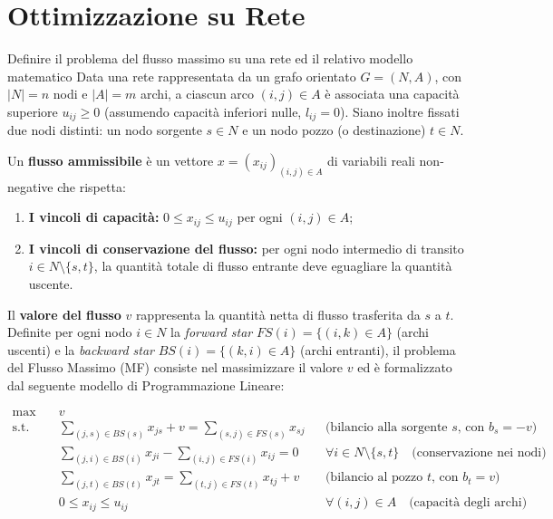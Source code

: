\documentclass[12pt]{extarticle} %
\begin{document}
\newpage

\section{Ottimizzazione su Rete}


\begin{teoriabox}{Definire il problema del flusso massimo su una rete ed il relativo modello matematico}
Data una rete rappresentata da un grafo orientato $G = (N, A)$, con $|N| = n$ nodi e $|A| = m$ archi, a ciascun arco $(i, j) \in A$ è associata una capacità superiore $u_{ij} \ge 0$ (assumendo capacità inferiori nulle, $l_{ij} = 0$). Siano inoltre fissati due nodi distinti: un nodo sorgente $s \in N$ e un nodo pozzo (o destinazione) $t \in N$.

Un \textbf{flusso ammissibile} è un vettore $x = (x_{ij})_{(i,j) \in A}$ di variabili reali non-negative che rispetta:
\begin{enumerate}
    \item \textbf{I vincoli di capacità:} $0 \le x_{ij} \le u_{ij}$ per ogni $(i, j) \in A$;
    \item \textbf{I vincoli di conservazione del flusso:} per ogni nodo intermedio di transito $i \in N \setminus \{s, t\}$, la quantità totale di flusso entrante deve eguagliare la quantità uscente.
\end{enumerate}

Il \textbf{valore del flusso} $v$ rappresenta la quantità netta di flusso trasferita da $s$ a $t$.
Definite per ogni nodo $i \in N$ la \emph{forward star} $FS(i) = \{(i, k) \in A\}$ (archi uscenti) e la \emph{backward star} $BS(i) = \{(k, i) \in A\}$ (archi entranti), il problema del Flusso Massimo (MF) consiste nel massimizzare il valore $v$ ed è formalizzato dal seguente modello di Programmazione Lineare:

\begin{align*}
    \max \quad & v \\
    \text{s.t.} \quad 
    & \sum_{(j, s) \in BS(s)} x_{js} + v = \sum_{(s, j) \in FS(s)} x_{sj} && \text{(bilancio alla sorgente $s$, con $b_s = -v$)} \\
    & \sum_{(j, i) \in BS(i)} x_{ji} - \sum_{(i, j) \in FS(i)} x_{ij} = 0 && \forall i \in N \setminus \{s, t\} \quad \text{(conservazione nei nodi)} \\
    & \sum_{(j, t) \in BS(t)} x_{jt} = \sum_{(t, j) \in FS(t)} x_{tj} + v && \text{(bilancio al pozzo $t$, con $b_t = v$)} \\
    & 0 \le x_{ij} \le u_{ij} && \forall (i, j) \in A \quad \text{(capacità degli archi)}
\end{align*}
\end{teoriabox}
\end{document}

